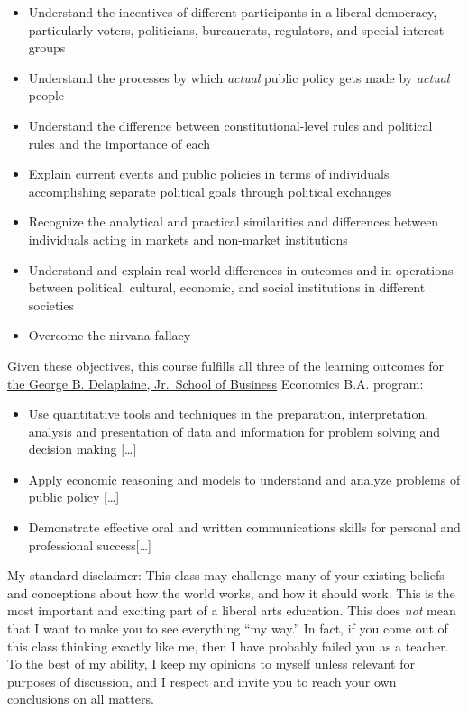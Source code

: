 \documentclass{article}
\providecommand{\tightlist}{%
  \setlength{\itemsep}{0pt}\setlength{\parskip}{0pt}}
\begin{document}
\begin{itemize}
\tightlist
\item
  Understand the incentives of different participants in a liberal
  democracy, particularly voters, politicians, bureaucrats, regulators,
  and special interest groups
\item
  Understand the processes by which \emph{actual} public policy gets
  made by \emph{actual} people
\item
  Understand the difference between constitutional-level rules and
  political rules and the importance of each
\item
  Explain current events and public policies in terms of individuals
  accomplishing separate political goals through political exchanges
\item
  Recognize the analytical and practical similarities and differences
  between individuals acting in markets and non-market institutions
\item
  Understand and explain real world differences in outcomes and in
  operations between political, cultural, economic, and social
  institutions in different societies
\item
  Overcome the nirvana fallacy
\end{itemize}

Given these objectives, this course fulfills all three of the learning
outcomes for
\href{https://www.hood.edu/academics/departments/george-b-delaplaine-jr-school-business/student-learning-outcomes}{the
George B. Delaplaine, Jr.~School of Business} Economics B.A. program:

\begin{itemize}
\tightlist
\item
  Use quantitative tools and techniques in the preparation,
  interpretation, analysis and presentation of data and information for
  problem solving and decision making {[}\ldots{]}
\item
  Apply economic reasoning and models to understand and analyze problems
  of public policy {[}\ldots{]}
\item
  Demonstrate effective oral and written communications skills for
  personal and professional success{[}\ldots{]}
\end{itemize}

{My standard disclaimer:} This class may challenge many of your existing
beliefs and conceptions about how the world works, and how it should
work. This is the most important and exciting part of a liberal arts
education. This does \emph{not} mean that I want to make you to see
everything ``my way.'' In fact, if you come out of this class thinking
exactly like me, then I have probably failed you as a teacher. To the
best of my ability, I keep my opinions to myself unless relevant for
purposes of discussion, and I respect and invite you to reach your own
conclusions on all matters.
\end{document}
